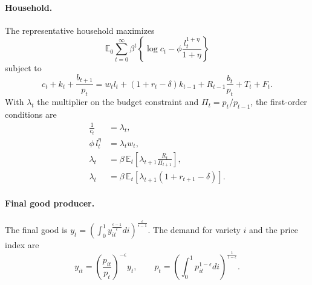 \documentclass[11pt]{article}
\begin{document}
\paragraph{Household.} The representative household maximizes
\begin{equation*}
\mathbb{E}_0 \sum_{t=0}^{\infty} \beta^t \left\{ \log c_t - \phi \frac{l_t^{1+\eta}}{1+\eta} \right\}
\end{equation*}
subject to
\begin{equation*}
c_t + k_t + \frac{b_{t+1}}{p_t} = w_t l_t + (1 + r_t - \delta) k_{t-1} + R_{t-1} \frac{b_t}{p_t} + T_t + F_t .
\end{equation*}
With $\lambda_t$ the multiplier on the budget constraint and $\Pi_t = p_t/p_{t-1}$, the first-order conditions are
\begin{align}
\frac{1}{c_t} &= \lambda_t, \\
\phi\, l_t^{\eta} &= \lambda_t w_t, \\
\lambda_t &= \beta\, \mathbb{E}_t \left[ \lambda_{t+1} \frac{R_t}{\Pi_{t+1}} \right], \\
\lambda_t &= \beta\, \mathbb{E}_t \left[ \lambda_{t+1} (1 + r_{t+1} - \delta) \right].
\end{align}

\paragraph{Final good producer.} The final good is $y_t = \left( \int_0^1 y_{it}^{\frac{\epsilon-1}{\epsilon}} di \right)^{\frac{\epsilon}{\epsilon-1}}$. The demand for variety $i$ and the price index are
\begin{equation}
y_{it} = \left( \frac{p_{it}}{p_t} \right)^{-\epsilon} y_t, \qquad
p_t = \left( \int_0^1 p_{it}^{1-\epsilon} di \right)^{\frac{1}{1-\epsilon}} .
\end{equation}
\end{document}
